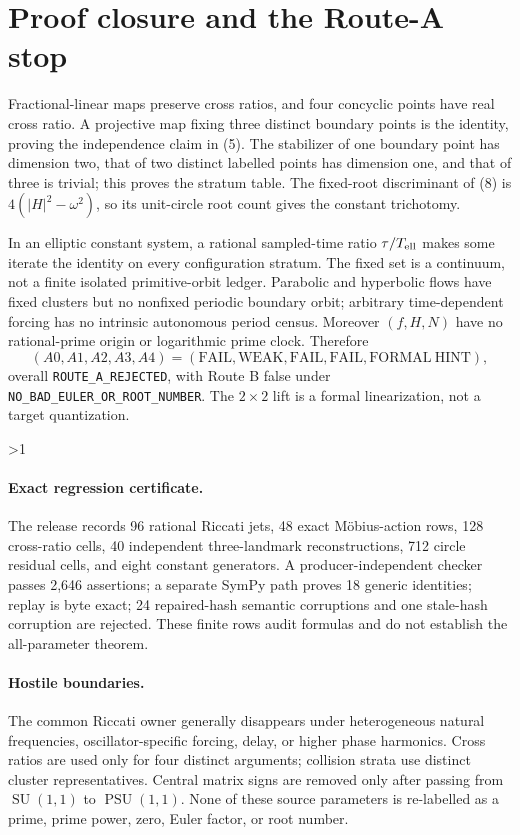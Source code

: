 \documentclass[8pt]{extarticle}
\newcommand{\PSU}{\operatorname{PSU}}
\newcommand{\SU}{\operatorname{SU}}
\begin{document}
\section{Proof closure and the Route-A stop}
Fractional-linear maps preserve cross ratios, and four concyclic points have
real cross ratio.  A projective map fixing three distinct boundary points is
the identity, proving the independence claim in (5).  The stabilizer of one
boundary point has dimension two, that of two distinct labelled points has
dimension one, and that of three is trivial; this proves the stratum table.
The fixed-root discriminant of (8) is $4(|H|^2-\omega^2)$, so its unit-circle
root count gives the constant trichotomy.

In an elliptic constant system, a rational sampled-time ratio
$\tau/T_{\rm ell}$ makes some iterate the identity on every configuration
stratum.  The fixed set is a continuum, not a finite isolated primitive-orbit
ledger.  Parabolic and hyperbolic flows have fixed clusters but no nonfixed
periodic boundary orbit; arbitrary time-dependent forcing has no intrinsic
autonomous period census.  Moreover $(f,H,N)$ have no rational-prime origin or
logarithmic prime clock.  Therefore
\begin{equation}
 (A0,A1,A2,A3,A4)=(\mathrm{FAIL},\mathrm{WEAK},\mathrm{FAIL},
 \mathrm{FAIL},\mathrm{FORMAL\ HINT}),                      \tag{9}
\end{equation}
overall \texttt{ROUTE\_A\_REJECTED}, with Route B false under
\texttt{NO\_BAD\_EULER\_OR\_ROOT\_NUMBER}.  The $2\times2$ lift is a
formal linearization, not a target quantization.

\ifnum\CRevisionRound>1
\paragraph{Exact regression certificate.}
The release records 96 rational Riccati jets, 48 exact M\"obius-action rows,
128 cross-ratio cells, 40 independent three-landmark reconstructions, 712
circle residual cells, and eight constant generators.  A producer-independent
checker passes 2,646 assertions; a separate SymPy path proves 18 generic
identities; replay is byte exact; 24 repaired-hash semantic corruptions and
one stale-hash corruption are rejected.  These finite rows audit formulas and
do not establish the all-parameter theorem.

\paragraph{Hostile boundaries.}
The common Riccati owner generally disappears under heterogeneous natural
frequencies, oscillator-specific forcing, delay, or higher phase harmonics.
Cross ratios are used only for four distinct arguments; collision strata use
distinct cluster representatives.  Central matrix signs are removed only
after passing from $\SU(1,1)$ to $\PSU(1,1)$.  None of these source parameters
is re-labelled as a prime, prime power, zero, Euler factor, or root number.
\fi
\end{document}
